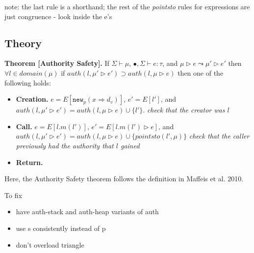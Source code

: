 \documentclass{llncs}
\newcommand{\keywadj}[1]{\mathtt{#1}}
\newcommand{\stepsto}{\leadsto}
\begin{document}
note: the last rule is a shorthand; the rest of the \textit{pointsto} rules for expressions are just congruence - look inside the e's


\newpage

\subsection{Theory}

\textbf{Theorem [Authority Safety].}  If $\Sigma \vdash \mu$, $\bullet, \Sigma \vdash e : \tau$, and $\mu \rhd e \stepsto \mu' \rhd e'$ then $\forall l \in domain(\mu)$ if $auth(l,\mu' \rhd e') \supset auth(l,\mu \rhd e)$ then one of the following holds:

\begin{itemize}
  \item \textbf{Creation.} $e = E[\keywadj{new}_p(x \Rightarrow d_v)]$, $e' = E[l']$, and $auth(l,\mu' \rhd e') = auth(l,\mu \rhd e) \cup \{ l' \}$.  \textit{check that the creator was $l$}
  \item \textbf{Call.} $e = E[l.m(l')]$, $e' = E[l.m(l') \rhd e]$, and $auth(l,\mu' \rhd e') = auth(l,\mu \rhd e) \cup \{ pointsto(l',\mu) \}$  \textit{check that the caller previously had the authority that $l$ gained}
  \item \textbf{Return.}
\end{itemize}

Here, the Authority Safety theorem follows the definition in Maffeis et al. 2010.

To fix

\begin{itemize}
  \item have auth-stack and auth-heap variants of auth
  \item use s consistently instead of p
  \item don't overload triangle
\end{itemize}
\end{document}

